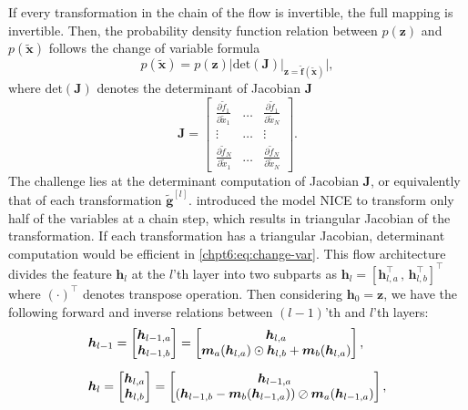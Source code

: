 If every transformation in the chain of the flow is invertible, the full mapping is invertible.
Then, the probability density function relation between $p(\bm{z})$ and $p(\tilde{\bm{x}})$ follows the change of variable formula
\begin{equation}\label{chpt6:eq:change-var}
  p(\tilde{\bm{x}}) =  p(\bm{z}) \bigg| \mathrm{det}(\bm{J}) \big|_{\bm{z}=\tilde{\bm{f}}(\tilde{\bm{x}})}\bigg|,
\end{equation}
where $\mathrm{det}(\bm{J})$ denotes the determinant of Jacobian $\bm{J}$
\begin{equation}
  \bm{J} = \left[
    \begin{array}{ccc}
      \frac{\partial \tilde{f}_1}{\partial \tilde{x}_1} & \hdots & \frac{\partial \tilde{f}_1}{\partial \tilde{x}_N} \\
      \vdots & \hdots & \vdots \\
      \frac{\partial \tilde{f}_N}{\partial \tilde{x}_1} & \hdots & \frac{\partial \tilde{f}_N}{\partial \tilde{x}_N}
    \end{array}
  \right].
\end{equation}
The challenge lies at the determinant computation of Jacobian $\bm{J}$, or equivalently that of each transformation $\tilde{\bm{g}}^{[l]}$. \cite{DBLP:journals/corr/DinhKB14} introduced the model NICE to transform only half of the variables at a chain step, which results in triangular Jacobian of the transformation. If each transformation has a triangular Jacobian, determinant computation would be efficient in \eqref{chpt6:eq:change-var}.
This flow architecture divides the feature $\bm{h}_l$ at the $l$'th layer into two subparts as
$\bm{h}_l = [\bm{h}_{l,a}^{\intercal} \, , \, \bm{h}_{l,b}^{\intercal}]^{\intercal}$ where
$(\cdot)^{\intercal}$ denotes transpose operation. Then considering $\bm{h}_0 = \bm{z}$, we have the following forward and inverse relations between $(l-1)$'th and $l$'th layers:
\begin{equation}\label{eq-gl}
  \begin{array}{l}
    \bm{h}_{l-1} =
    \begin{bmatrix}
      \bm{h}_{l-1,a}\\
      \bm{h}_{l-1,b}
    \end{bmatrix}
    =
    \begin{bmatrix}
      \bm{h}_{l,a}\\
      \bm{m}_a(\bm{h}_{l,a})\odot \bm{h}_{l,b} + \bm{m}_b(\bm{h}_{l,a})
    \end{bmatrix},\vspace{10pt}\\
    \bm{h}_{l} =
    \begin{bmatrix}
      \bm{h}_{l,a}\\
      \bm{h}_{l,b}
    \end{bmatrix}
    =
    \begin{bmatrix}
      \bm{h}_{l-1,a}\\
      \left(  \bm{h}_{l-1,b} - \bm{m}_b(\bm{h}_{l-1,a}) \right)\oslash \bm{m}_a(\bm{h}_{l-1,a}) 
    \end{bmatrix}, \\
  \end{array}  
\end{equation}
